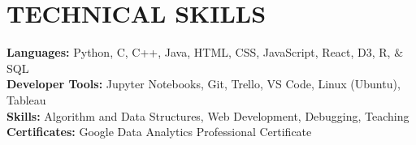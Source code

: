 \documentclass[a4paper,11pt]{article}
\newcommand{\seticon}[1]{\textcolor{Cerulean}{\csname #1\endcsname}}
\begin{document}
\section{ \textbf{TECHNICAL SKILLS}} %
\begin{itemize}[leftmargin=0.15in, label={}]
    \small{\item{
     \textbf{Languages:}{ Python, C, C++, Java, HTML, CSS, JavaScript, React, D3, R, $\&$ SQL} \\		   
    \textbf{Developer Tools:}{ Jupyter Notebooks, Git, Trello, VS Code, Linux (Ubuntu), Tableau}\\
    \textbf{Skills:}{ Algorithm and Data Structures, Web Development, Debugging, Teaching}\\ 
    \textbf{Certificates:}{ Google Data Analytics Professional Certificate}\\
    }}
 \end{itemize} \vspace{-13pt}
\end{document}
